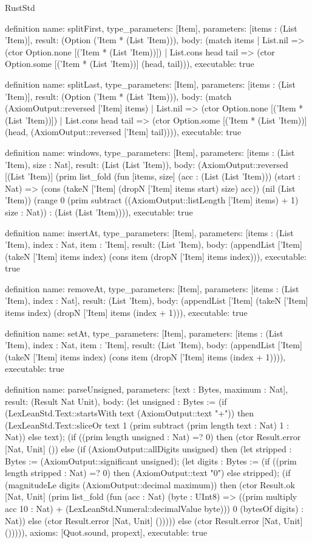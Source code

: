 \begin{lexlean}{RustStd}
\begin{semanticmodule}
definition{
  name: splitFirst,
  type_parameters: [Item],
  parameters: [items : (List 'Item)],
  result: (Option ('Item * (List 'Item))),
  body: (match items | List.nil => (ctor Option.none [('Item * (List 'Item))]) | List.cons head tail => (ctor Option.some [('Item * (List 'Item))] (head, tail))),
  executable: true
}

definition{
  name: splitLast,
  type_parameters: [Item],
  parameters: [items : (List 'Item)],
  result: (Option ('Item * (List 'Item))),
  body: (match (AxiomOutput::reversed ['Item] items) | List.nil => (ctor Option.none [('Item * (List 'Item))]) | List.cons head tail => (ctor Option.some [('Item * (List 'Item))] (head, (AxiomOutput::reversed ['Item] tail)))),
  executable: true
}

definition{
  name: windows,
  type_parameters: [Item],
  parameters: [items : (List 'Item), size : Nat],
  result: (List (List 'Item)),
  body: (AxiomOutput::reversed [(List 'Item)] (prim list_fold (fun [items, size] (acc : (List (List 'Item))) (start : Nat) => (cons (takeN ['Item] (dropN ['Item] items start) size) acc)) (nil (List 'Item)) (range 0 (prim subtract ((AxiomOutput::listLength ['Item] items) + 1) size : Nat)) : (List (List 'Item)))),
  executable: true
}

definition{
  name: insertAt,
  type_parameters: [Item],
  parameters: [items : (List 'Item), index : Nat, item : 'Item],
  result: (List 'Item),
  body: (appendList ['Item] (takeN ['Item] items index) (cons item (dropN ['Item] items index))),
  executable: true
}

definition{
  name: removeAt,
  type_parameters: [Item],
  parameters: [items : (List 'Item), index : Nat],
  result: (List 'Item),
  body: (appendList ['Item] (takeN ['Item] items index) (dropN ['Item] items (index + 1))),
  executable: true
}

definition{
  name: setAt,
  type_parameters: [Item],
  parameters: [items : (List 'Item), index : Nat, item : 'Item],
  result: (List 'Item),
  body: (appendList ['Item] (takeN ['Item] items index) (cons item (dropN ['Item] items (index + 1)))),
  executable: true
}

definition{
  name: parseUnsigned,
  parameters: [text : Bytes, maximum : Nat],
  result: (Result Nat Unit),
  body: (let unsigned : Bytes := (if (LexLeanStd.Text::startsWith text (AxiomOutput::text "+")) then (LexLeanStd.Text::sliceOr text 1 (prim subtract (prim length text : Nat) 1 : Nat)) else text); (if ((prim length unsigned : Nat) =? 0) then (ctor Result.error [Nat, Unit] ()) else (if (AxiomOutput::allDigits unsigned) then (let stripped : Bytes := (AxiomOutput::significant unsigned); (let digits : Bytes := (if ((prim length stripped : Nat) =? 0) then (AxiomOutput::text "0") else stripped); (if (magnitudeLe digits (AxiomOutput::decimal maximum)) then (ctor Result.ok [Nat, Unit] (prim list_fold (fun (acc : Nat) (byte : UInt8) => ((prim multiply acc 10 : Nat) + (LexLeanStd.Numeral::decimalValue byte))) 0 (bytesOf digits) : Nat)) else (ctor Result.error [Nat, Unit] ())))) else (ctor Result.error [Nat, Unit] ())))),
  axioms: [Quot.sound, propext],
  executable: true
}


\end{semanticmodule}
\end{lexlean}
